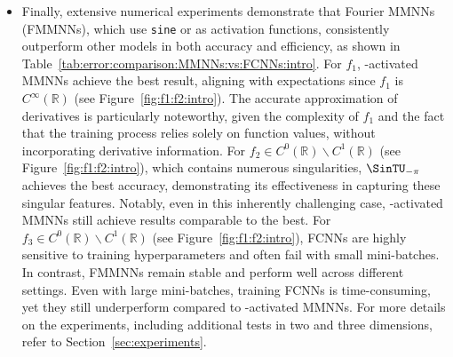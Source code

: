 \documentclass[11pt,a4paper]{article}
\begin{document}
\begin{itemize}
\item 
Finally, extensive numerical experiments demonstrate that Fourier MMNNs (FMMNNs), which use \texttt{sine} or  as activation functions, consistently outperform other models in both accuracy and efficiency, as shown in Table~\ref{tab:error:comparison:MMNNs:vs:FCNNs:intro}. For \( f_1 \), \sine{}-activated MMNNs achieve the best result, aligning with expectations since \( f_1 \) is \( C^\infty(\mathbb{R}) \) (see Figure~\ref{fig:f1:f2:intro}). The accurate approximation of derivatives is particularly noteworthy, given the complexity of \( f_1 \) and the fact that
the training process relies
solely on function values, without incorporating derivative information.
For \( f_2 \in C^0(\mathbb{R}) \backslash C^1(\mathbb{R}) \) (see Figure~\ref{fig:f1:f2:intro}), which contains numerous singularities, \( \SinTU_{-\pi} \) achieves the best accuracy, demonstrating its effectiveness in capturing these singular features.
Notably, even in this inherently challenging case, \sine{}-activated MMNNs still achieve results comparable to the best. 
For \( f_3 \in C^0(\mathbb{R}) \backslash C^1(\mathbb{R}) \) (see Figure~\ref{fig:f1:f2:intro}), FCNNs are highly sensitive to training hyperparameters and often fail with small mini-batches. In contrast, FMMNNs remain stable and perform well across different settings. Even with large mini-batches, training FCNNs is time-consuming, yet they still underperform compared to \sine-activated MMNNs.
For more details on the experiments, including additional tests in two and three dimensions, refer to Section~\ref{sec:experiments}.




\end{itemize}
\end{document}
